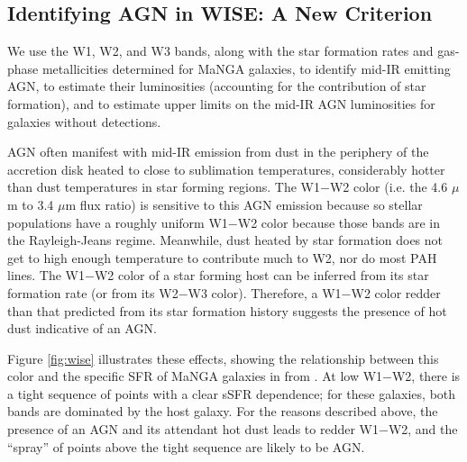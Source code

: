\documentclass[12pt, preprint]{hacked-aastex}
\begin{document}
\subsection{Identifying AGN in WISE: A New Criterion}

We use the W1, W2, and W3 bands, along with the star formation rates 
and gas-phase metallicities determined for MaNGA galaxies, to identify
mid-IR emitting AGN, to estimate their luminosities (accounting for the
contribution of star formation), and to estimate upper limits on the 
mid-IR AGN luminosities for galaxies without detections.

AGN often manifest with mid-IR emission from dust in the periphery 
of the accretion disk heated to close to sublimation temperatures, considerably
hotter than dust temperatures in star forming regions. 
The W1$-$W2 color (i.e. the 4.6 $\mu$m to 3.4 $\mu$m flux ratio) 
is sensitive to this AGN emission because 
so stellar populations have a roughly uniform W1$-$W2 color because 
those bands are in the Rayleigh-Jeans regime.
Meanwhile, dust heated by star formation does not get to high
enough temperature to contribute much to W2, nor do most PAH
lines.  
The W1$-$W2 color of a star forming host can be inferred
from its star formation rate (or from its W2$-$W3 color).
Therefore, a W1$-$W2 color redder than that predicted 
from its star formation history suggests the presence
of hot dust indicative of an AGN. 

Figure \ref{fig:wise} illustrates these effects, showing
the relationship between this color and 
the specific SFR of MaNGA galaxies in  from \cite{sanchez22a}.
At low W1$-$W2, there is 
a tight sequence of points with a clear sSFR dependence; for
these galaxies, both bands are dominated by the host galaxy. 
For the reasons described above, the presence of an AGN and its
attendant hot dust leads to 
redder W1$-$W2, and the ``spray'' of points above the
tight sequence are likely to be AGN. 
\end{document}
